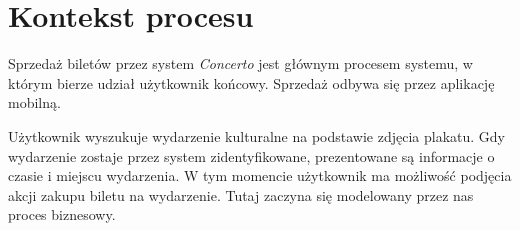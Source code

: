 \section{Kontekst procesu}

Sprzedaż biletów przez system \emph{Concerto} jest głównym procesem systemu, w
którym bierze udział użytkownik końcowy. Sprzedaż odbywa się przez aplikację
mobilną.

Użytkownik wyszukuje wydarzenie kulturalne na podstawie zdjęcia plakatu.
Gdy wydarzenie zostaje przez system zidentyfikowane, prezentowane
są informacje o czasie i miejscu wydarzenia. W tym momencie użytkownik ma
możliwość podjęcia akcji zakupu biletu na wydarzenie. Tutaj zaczyna się
modelowany przez nas proces biznesowy.
